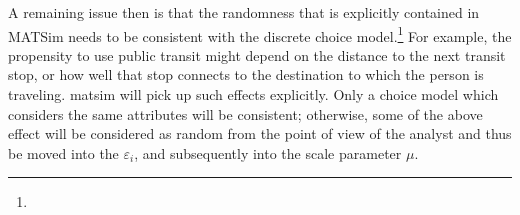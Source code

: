 A remaining issue then is that the randomness that is explicitly contained in MATSim needs to be consistent with the discrete choice model.\footnote{
%
%
}
%
For example, the propensity to use public transit might depend on the distance to the next transit stop, or how well that stop connects to the destination to which the person is traveling.  \acrshort{matsim} will pick up such effects explicitly.  Only a choice model which considers the same attributes will be consistent; otherwise, some of the above effect will be considered as random from the point of view of the analyst and thus be moved into the $\varepsilon_i$, and subsequently into the scale parameter $\mu$.
%
%
%
%
%
%

